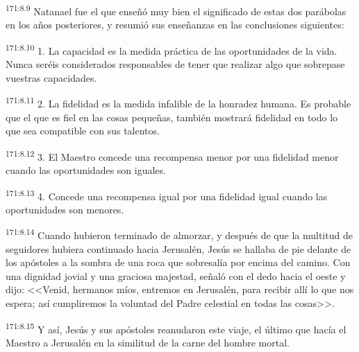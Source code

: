 \par 
\textsuperscript{171:8.9} Natanael fue el que enseñó muy bien el significado de estas dos parábolas en los años posteriores, y resumió sus enseñanzas en las conclusiones siguientes:

\par 
\textsuperscript{171:8.10} 1. La capacidad es la medida práctica de las oportunidades de la vida. Nunca seréis considerados responsables de tener que realizar algo que sobrepase vuestras capacidades.

\par 
\textsuperscript{171:8.11} 2. La fidelidad es la medida infalible de la honradez humana. Es probable que el que es fiel en las cosas pequeñas, también mostrará fidelidad en todo lo que sea compatible con sus talentos.

\par 
\textsuperscript{171:8.12} 3. El Maestro concede una recompensa menor por una fidelidad menor cuando las oportunidades son iguales.

\par 
\textsuperscript{171:8.13} 4. Concede una recompensa igual por una fidelidad igual cuando las oportunidades son menores.

\par 
\textsuperscript{171:8.14} Cuando hubieron terminado de almorzar, y después de que la multitud de seguidores hubiera continuado hacia Jerusalén, Jesús se hallaba de pie delante de los apóstoles a la sombra de una roca que sobresalía por encima del camino. Con una dignidad jovial y una graciosa majestad, señaló con el dedo hacia el oeste y dijo: <<Venid, hermanos míos, entremos en Jerusalén, para recibir allí lo que nos espera; así cumpliremos la voluntad del Padre celestial en todas las cosas>>.

\par 
\textsuperscript{171:8.15} Y así, Jesús y sus apóstoles reanudaron este viaje, el último que hacía el Maestro a Jerusalén en la similitud de la carne del hombre mortal.